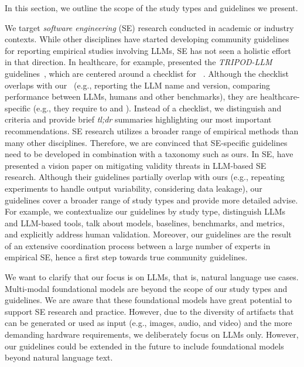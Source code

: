 In this section, we outline the scope of the study types and guidelines we present.


We target \emph{software engineering} (SE) research conducted in academic or industry contexts.
While other disciplines have started developing community guidelines for reporting empirical studies involving LLMs, SE has not seen a holistic effort in that direction.
In healthcare, for example, \citeauthor{Gallifant2025} presented the \emph{TRIPOD-LLM} guidelines~\cite{Gallifant2025}, which are centered around a checklist for ~\cite{Gallifant2025}.
Although the checklist overlaps with our \guidelines~(e.g., reporting the LLM name and version, comparing performance between LLMs, humans and other benchmarks), they are healthcare-specific (e.g., they require to  and ).
Instead of a checklist, we distinguish \must and \should criteria and provide brief \emph{tl;dr} summaries highlighting our most important recommendations.
SE research utilizes a broader range of empirical methods than many other disciplines.
Therefore, we are convinced that SE-specific guidelines need to be developed in combination with a \studytypes taxonomy such as ours.
In SE, \citeauthor{sallou2024breaking} have presented a vision paper on mitigating validity threats in LLM-based SE research.
Although their guidelines partially overlap with ours (e.g., repeating experiments to handle output variability, considering data leakage), our guidelines cover a broader range of study types and provide more detailed advise.
For example, we contextualize our guidelines by study type, distinguish LLMs and LLM-based tools, talk about models, baselines, benchmarks, and metrics, and explicitly address human validation.
Moreover, our guidelines are the result of an extensive coordination process between a large number of experts in empirical SE, hence a first step towards true community guidelines.




We want to clarify that our focus is on LLMs, that is, natural language use cases.
Multi-modal foundational models are beyond the scope of our study types and guidelines.
We are aware that these foundational models have great potential to support SE research and practice.
However, due to the diversity of artifacts that can be generated or used as input (e.g., images, audio, and video) and the more demanding hardware requirements, we deliberately focus on LLMs only.
However, our guidelines could be extended in the future to include foundational models beyond natural language text.

